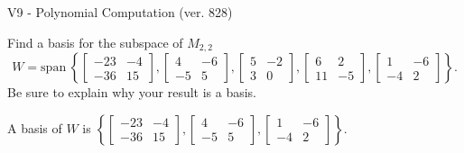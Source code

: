 \begin{exercise}
  \begin{exerciseTitle}V9 - Polynomial Computation (ver. 828)\end{exerciseTitle}
  \begin{exerciseStatement}
    Find a basis for the subspace of \(M_{2,2}\) 
\[W=\mathrm{span}\ \left\{\left[\begin{array}{cc}
-23 & -4 \\
-36 & 15
\end{array}\right] , \left[\begin{array}{cc}
4 & -6 \\
-5 & 5
\end{array}\right] , \left[\begin{array}{cc}
5 & -2 \\
3 & 0
\end{array}\right] , \left[\begin{array}{cc}
6 & 2 \\
11 & -5
\end{array}\right] , \left[\begin{array}{cc}
1 & -6 \\
-4 & 2
\end{array}\right]\right\}.\]
 Be sure to explain why your result is a basis.


  \end{exerciseStatement}
  \begin{exerciseAnswer}
   A basis of \(W\) is  \(\left\{\left[\begin{array}{cc}
-23 & -4 \\
-36 & 15
\end{array}\right] , \left[\begin{array}{cc}
4 & -6 \\
-5 & 5
\end{array}\right] , \left[\begin{array}{cc}
1 & -6 \\
-4 & 2
\end{array}\right]\right\}\).
  


  \end{exerciseAnswer}
\end{exercise}